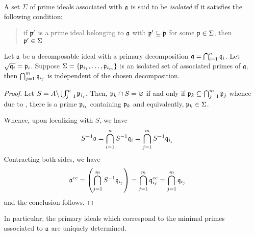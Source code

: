 \begin{definition}
    A set $\Sigma$ of prime ideals associated with $\mathfrak a$ is said to be \emph{isolated} if it satisfies the following condition: 
    \begin{quote}
        if $\mathfrak p'$ is a prime ideal belonging to $\mathfrak a$ with $\mathfrak p'\subseteq\mathfrak p$ for some $\mathfrak p\in\Sigma$, then $\mathfrak p'\in\Sigma$
    \end{quote}
\end{definition}

\begin{theorem}
    Let $\mathfrak a$ be a decomposable ideal with a primary decomposition $\mathfrak a = \bigcap_{i = 1}^n\mathfrak q_i$. Let $\sqrt{\mathfrak q_i} = \mathfrak p_i$. Suppose $\Sigma = \{\mathfrak p_{i_1},\ldots,\mathfrak p_{i_m}\}$ is an isolated set of associated primes of $\mathfrak a$, then $\bigcap_{j = 1}^m\mathfrak q_{i_j}$ is independent of the chosen decomposition.
\end{theorem}
\begin{proof}
    Let $S = A\backslash\bigcup_{j = 1}^m\mathfrak p_{i_j}$. Then, $\mathfrak p_k\cap S = \varnothing$ if and only if $\mathfrak p_k\subseteq\bigcap_{j = 1}^m\mathfrak p_j$ whence due to , there is a prime $\mathfrak p_{i_t}$ containing $\mathfrak p_k$ and equivalently, $\mathfrak p_k\in\Sigma$. 

    Whence, upon localizing with $S$, we have 
    \begin{equation*}
        S^{-1}\mathfrak a = \bigcap_{i = 1}^n S^{-1}\mathfrak q_i = \bigcap_{j = 1}^m S^{-1}\mathfrak q_{i_j}
    \end{equation*}
    Contracting both sides, we have 
    \begin{equation*}
        \mathfrak a^{ec} = \left(\bigcap_{j = 1}^m S^{-1}\mathfrak q_{i_j}\right) = \bigcap_{j = 1}^m\mathfrak q_{i_j}^{ec} = \bigcap_{j = 1}^m\mathfrak q_{i_j}
    \end{equation*}
    and the conclusion follows.
\end{proof}

\begin{corollary}
    In particular, the primary ideals which correspond to the minimal primes associated to $\mathfrak a$ are uniquely determined.
\end{corollary}